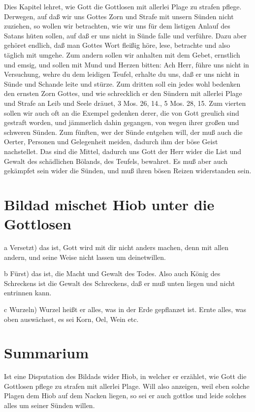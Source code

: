 Dies Kapitel lehret, wie Gott die Gottlosen mit allerlei Plage zu strafen pflege. Derwegen, auf daß wir uns Gottes Zorn und Strafe mit unsern Sünden nicht zuziehen, so wollen wir betrachten, wie wir uns für dem listigen Anlauf des Satans hüten sollen, auf daß er uns nicht in Sünde falle und verführe. Dazu aber gehöret endlich, daß man Gottes Wort fleißig höre, lese, betrachte und also täglich mit umgehe. Zum
andern sollen wir anhalten mit dem Gebet, ernstlich und emsig, und sollen mit Mund und Herzen bitten: Ach Herr, führe uns nicht in Versuchung, wehre du dem leidigen Teufel, erhalte du uns, daß er uns nicht in Sünde und Schande leite und stürze. Zum dritten soll ein jedes wohl bedenken den ernsten Zorn Gottes, und wie schrecklich er den Sündern mit allerlei Plage und Strafe an Leib und Seele dräuet, 3 Mos. 26, 14., 5 Mos. 28, 15. Zum vierten sollen wir auch oft an die Exempel gedenken derer, die von Gott greulich sind gestraft worden, und jämmerlich dahin gegangen, von wegen ihrer großen und schweren Sünden. Zum fünften, wer der Sünde entgehen will, der muß auch die Oerter, Personen und Gelegenheit meiden, dadurch ihm der böse Geist nachstellet. Das sind die Mittel, dadurch uns Gott der Herr wider die List und Gewalt des schädlichen Bölands, des Teufels, bewahret. Es muß aber auch gekämpfet sein wider die Sünden, und muß ihren bösen Reizen widerstanden sein.

\section{Bildad mischet Hiob unter die Gottlosen}

a Versetzt) das ist, Gott wird mit dir nicht anders machen, denn mit allen andern, und seine Weise nicht lassen um deinetwillen.

b Fürst) das ist, die Macht und Gewalt des Todes. Also auch König des Schreckens ist die Gewalt des Schreckens, daß er muß unten liegen und nicht entrinnen kann.

c Wurzeln) Wurzel heißt er alles, was in der Erde gepflanzet ist. Ernte alles, was oben auswächset, es sei Korn, Oel, Wein etc.

\section{Summarium}

Ist eine Disputation des Bildads wider Hiob, in welcher er erzählet, wie Gott die Gottlosen pflege zu strafen mit allerlei Plage. Will also anzeigen, weil eben solche Plagen dem Hiob auf dem Nacken liegen, so sei er auch gottlos und leide solches alles um seiner Sünden willen.

